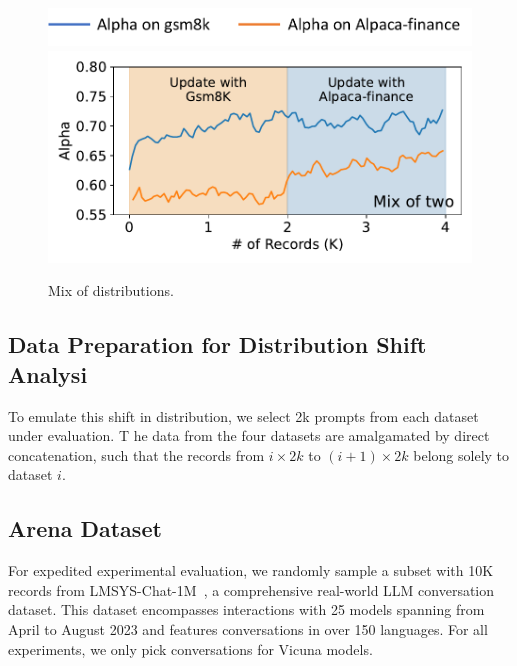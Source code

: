 \begin{figure}      
    \centering
    \includegraphics[width=0.48\linewidth]{figures/appendix_legend.pdf} \\
    \includegraphics[width=0.48\linewidth]{figures/mix.pdf}
    \caption{Mix of distributions.}
    \label{fig:mix}
\end{figure}

\subsection{Data Preparation for Distribution Shift Analysi}
To emulate this shift in distribution, 
\label{appendix:distribution-shift}
we select 2k prompts from each dataset under evaluation. T
he data from the four datasets are amalgamated by direct concatenation, 
such that the records from $i\times2k$ to $(i+1)\times2k$ belong solely to dataset 
$i$. 

\subsection{Arena Dataset}
\label{appendix:arena}
For expedited experimental evaluation, we randomly sample a subset with 10K records
from LMSYS-Chat-1M~\cite{zheng2023lmsyschat1m}, 
a comprehensive real-world LLM conversation dataset. This dataset encompasses interactions with 25 models spanning 
from April to August 2023 and features conversations in over 150 languages. For all experiments, we only pick conversations for Vicuna models.


